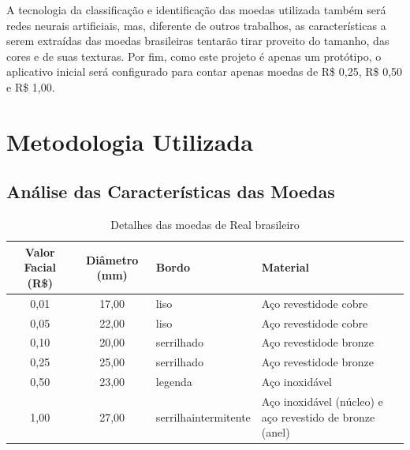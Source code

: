 \documentclass[10pt,journal,compsoc]{IEEEtran}
\begin{document}
A tecnologia da classificação e identificação das moedas utilizada também será redes neurais artificiais, mas, diferente de outros trabalhos, as características a serem extraídas das moedas brasileiras tentarão tirar proveito do tamanho, das cores e de suas texturas. Por fim, como este projeto é apenas um protótipo, o aplicativo inicial será configurado para contar apenas moedas de R\$ 0,25, R\$  0,50 e R\$ 1,00.

\section{Metodologia Utilizada}
\label{sec:metologia-utilizada}

\subsection{Análise das Características das Moedas}
\label{sec:metodologia-moedas}

\begin{table}[]
\centering
\caption{Detalhes das moedas de Real brasileiro}
\label{tab:moedas}
\begin{tabular}{@{}ccll@{}}
\toprule
\textbf{Valor Facial (R\$)} & \textbf{Diâmetro (mm)} & \multicolumn{1}{l}{\textbf{Bordo}} & \multicolumn{1}{l}{\textbf{Material}}                    \\ \midrule
0,01                        & 17,00                  & liso                               & Aço revestidode cobre                                    \\
0,05                        & 22,00                  & liso                               & Aço revestidode cobre                                    \\
0,10                        & 20,00                  & serrilhado                         & Aço revestidode bronze                                   \\
0,25                        & 25,00                  & serrilhado                         & Aço revestidode bronze                                   \\
0,50                        & 23,00                  & legenda                            & Aço inoxidável                                           \\
1,00                        & 27,00                  & serrilhaintermitente               & Aço inoxidável (núcleo) e aço revestido de bronze (anel) \\ \bottomrule
\end{tabular}
\end{table}
\end{document}
